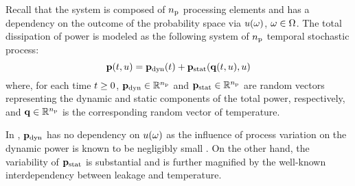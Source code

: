 Recall that the system is composed of ${n_\text{p}}$ processing elements and has a dependency on the outcome of the probability space via $u(\omega)$, $\omega \in \Omega$.
The total dissipation of power is modeled as the following system of ${n_\text{p}}$ temporal stochastic process:
\begin{equation} \elabel{power-model}
  \vP(\t, \u) = \vP_\dynamic(\t) + \vP_\static(\vQ(\t, \u), \u)
\end{equation}
where, for each time $t \geq 0$, $\mathbf{p}_{\text{dyn}} \in \mathbb{R}^{n_\text{p}}$ and $\mathbf{p}_{\text{stat}} \in \mathbb{R}^{n_\text{p}}$ are random vectors representing the dynamic and static components of the total power, respectively, and $\mathbf{q} \in \mathbb{R}^{n_\text{p}}$ is the corresponding random vector of temperature.
\begin{remark}
In , $\mathbf{p}_{\text{dyn}}$ has no dependency on $u(\omega)$ as the influence of process variation on the dynamic power is known to be negligibly small \cite{srivastava2010}.
On the other hand, the variability of $\mathbf{p}_{\text{stat}}$ is substantial and is further magnified by the well-known interdependency between leakage and temperature.
\end{remark}
